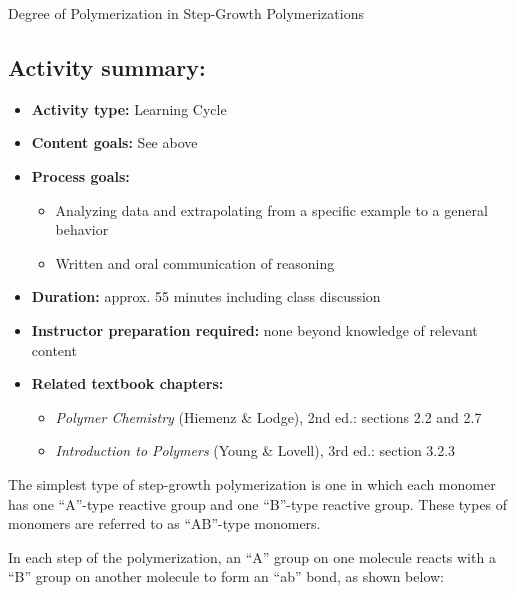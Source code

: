 \begin{activity}{Degree of Polymerization in Step-Growth Polymerizations}
\begin{instructornotes}
	\subsection*{Activity summary:}
	\begin{itemize}
		\item \textbf{Activity type:} Learning Cycle
		\item \textbf{Content goals:} See above
		\item \textbf{Process goals:} %
			\begin{itemize}
				\item Analyzing data and extrapolating from a specific example to a general behavior
				\item Written and oral communication of reasoning
			\end{itemize}
		\item \textbf{Duration:} approx. 55 minutes including class discussion
		\item \textbf{Instructor preparation required:} none beyond knowledge of relevant content
		\item \textbf{Related textbook chapters:}
			\begin{itemize}
				\item \emph{Polymer Chemistry} (Hiemenz \& Lodge), 2nd ed.: sections 2.2 and 2.7
				\item \emph{Introduction to Polymers} (Young \& Lovell), 3rd ed.: section 3.2.3
			\end{itemize}
	\end{itemize}

\end{instructornotes}


\begin{model}
\label{\labelbase:mdl:ABpolym}

The simplest type of step-growth polymerization is one in which each monomer has one ``A''-type reactive group and one ``B''-type reactive group.
These types of monomers are referred to as ``AB''-type monomers.

In each step of the polymerization, an ``A'' group on one molecule reacts with a ``B'' group on another molecule to form an ``ab'' bond, as shown below:


\end{model}
\end{activity}
